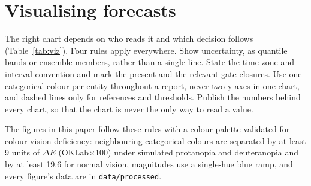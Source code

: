 \section{Visualising forecasts}
\label{sec:visual}

The right chart depends on who reads it and which decision follows (Table~\ref{tab:viz}). Four rules apply everywhere. Show uncertainty, as quantile bands or ensemble members, rather than a single line. State the time zone and interval convention and mark the present and the relevant gate closures. Use one categorical colour per entity throughout a report, never two y-axes in one chart, and dashed lines only for references and thresholds. Publish the numbers behind every chart, so that the chart is never the only way to read a value.

The figures in this paper follow these rules with a colour palette validated for colour-vision deficiency: neighbouring categorical colours are separated by at least 9 units of $\Delta E$ (OKLab$\times$100) under simulated protanopia and deuteranopia and by at least 19.6 for normal vision, magnitudes use a single-hue blue ramp, and every figure's data are in \texttt{data/processed}.


